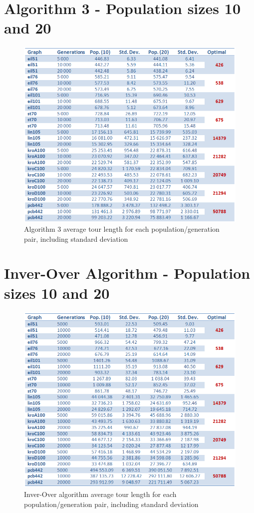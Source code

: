 \documentclass[a4paper,12pt]{article}
\begin{document}
\appendix
\newpage
\section{Algorithm 3 - Population sizes 10 and 20}
\begin{figure}[h]
\centering
\includegraphics[width=\linewidth]{Alg3_Pop10_20.png}
\caption{Algorithm 3 average tour length for each population/generation pair, including standard deviation}
\end{figure}

\newpage
\section{Inver-Over Algorithm - Population sizes 10 and 20}
\begin{figure}[h]
\centering
\includegraphics[width=\linewidth]{IV_Pop10_20.png}
\caption{Inver-Over algorithm average tour length for each population/generation pair, including standard deviation}
\end{figure}
\end{document}
